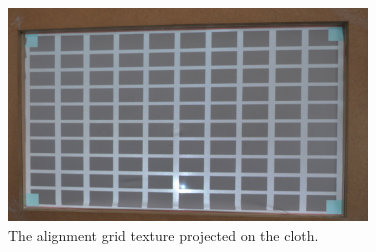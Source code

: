 \documentclass[]{article}
\begin{document}
\begin{figure}[hbtp]
    \centering
    \includegraphics[width=0.85\textwidth]{figures/ProjectedCalibrationGridC2.jpg}
    \caption{The alignment grid texture projected on the cloth.}
    \label{fig:ProjectedCalibrationGrid}
\end{figure}
\end{document}

